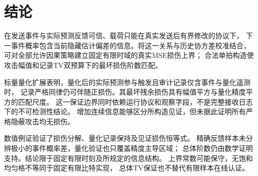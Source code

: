 \section{结论}
在发送事件与实际预测反馈可信、载荷只能在真实发送后有界修改的协议下，
下一事件概率包含当前隐藏估计偏差的信息。将这一关系与历史协方差校准结合，
可对全部允许因果策略建立固定有限时域的真实MSE损伤上界；
合法单拍构造使攻击幅值和记录TV双预算下的最坏损伤阶数匹配。

标量量化扩展表明，量化后的实际预测参与触发且审计记录仅含事件与量化遥测时，
记录严格同律仍可伴随正损伤。其最坏残余损伤具有幅值平方与量化精度平方的匹配尺度。
这一保证边界同时依赖运行协议和观察字段，不是完整接收日志下的不可检测性结论。
增加连续信息能够区分所构造见证，但未据此证明所有严格隐蔽攻击均无损伤。

数值例证验证了损伤分解、量化记录保持及见证损伤恒等式。
精确反馈样本未分辨极小的事件概率差，量化验证也只覆盖精度主导区域；
总体阶数仍由数学证明支持。结论限于固定有限时刻及所规定的信息结构。
上界常数可能保守，无饱和均匀格不等同于固定有限比特实现，
总体TV保证也不替代有限样本在线认证。
